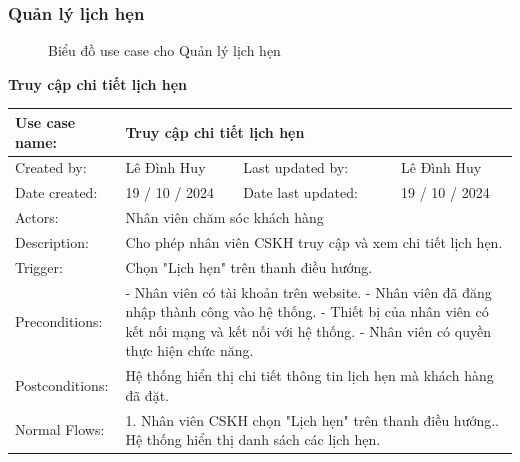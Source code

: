\subsubsection{Quản lý lịch hẹn}
\begin{figure}[H]
    \centering
    
    \vspace{0.5cm}
    \caption{Biểu đồ use case cho Quản lý lịch hẹn}
    \label{fig:enter-label}
\end{figure}
\textbf{Truy cập chi tiết lịch hẹn}
\begin{table}[H]
    \centering
    \begin{tabular}{|l|l|l|l|} 
        \hline
        Use case name: & \multicolumn{3}{|l|}{Truy cập chi tiết lịch hẹn} \\
        \hline
        Created by: & Lê Đình Huy & Last updated by: & Lê Đình Huy \\
        \hline
        Date created: & 19 / 10 / 2024 & Date last updated: & 19 / 10 / 2024 \\
        \hline
        Actors: & \multicolumn{3}{|l|}{Nhân viên chăm sóc khách hàng} \\
        \hline
        Description: & \multicolumn{3}{|p{12cm}|}{Cho phép nhân viên CSKH truy cập và xem chi tiết lịch hẹn.} \\ 
        \hline
        Trigger: & \multicolumn{3}{|p{12cm}|}{Chọn "Lịch hẹn" trên thanh điều hướng.} \\
        \hline
        Preconditions: & \multicolumn{3}{|p{12cm}|}{- Nhân viên có tài khoản trên website. \newline
        - Nhân viên đã đăng nhập thành công vào hệ thống. \newline
        - Thiết bị của nhân viên có kết nối mạng và kết nối với hệ thống. \newline
        - Nhân viên có quyền thực hiện chức năng.} \\
        \hline
        Postconditions: & \multicolumn{3}{|p{12cm}|}{Hệ thống hiển thị chi tiết thông tin lịch hẹn mà khách hàng đã đặt.} \\
        \hline
        Normal Flows: & \multicolumn{3}{|p{12cm}|}{1. Nhân viên CSKH chọn "Lịch hẹn" trên thanh điều hướng.\newline
        2. Hệ thống hiển thị danh sách các lịch hẹn.\newline
}
\end{tabular}
\end{table}
